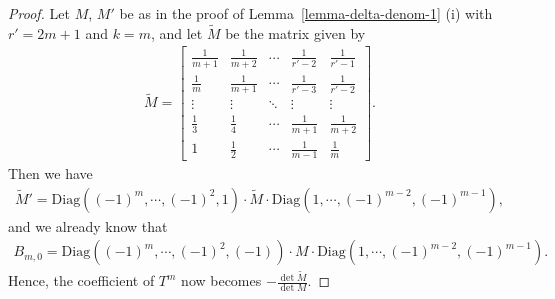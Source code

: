 \documentclass[11pt]{amsart}
\theoremstyle{definition}
\numberwithin{equation}{subsection}
\theoremstyle{plain}
\theoremstyle{plain}
\theoremstyle{plain}
\theoremstyle{plain}
\theoremstyle{plain}
\theoremstyle{plain}
\theoremstyle{plain}
\theoremstyle{plain}
\theoremstyle{plain}
\theoremstyle{plain}
\theoremstyle{plain}
\theoremstyle{plain}
\theoremstyle{definition}
\theoremstyle{definition}
\theoremstyle{definition}
\theoremstyle{remark}
\renewcommand{\(}{\textup{(}}
\renewcommand{\)}{\textup{)}}
\begin{document}
\begin{proof}
Let $M$, $M'$ be as in the proof of Lemma~\ref{lemma-delta-denom-1} (i) with $r'=2m+1$ and $k=m$, and let $\tilde M$ be the matrix given by
    \begin{align*}
        \tilde M
        =
        \begin{bmatrix}
          \frac{1}{m+1} & \frac{1}{m+2} & \cdots & \frac{1}{r'-2} & \frac{1}{r'-1} \\
          \frac{1}{m} & \frac{1}{m+1} & \cdots & \frac{1}{r'-3} & \frac{1}{r'-2} \\
          \vdots & \vdots & \ddots & \vdots & \vdots \\
          \frac{1}{3} & \frac{1}{4} & \cdots & \frac{1}{m+1} & \frac{1}{m+2} \\
          1 & \frac{1}{2} & \cdots & \frac{1}{m-1} & \frac{1}{m}
        \end{bmatrix}.
    \end{align*}
Then we have
    \begin{align*}
        \tilde{M}'=
        \mathrm{Diag}((-1)^m,\cdots,(-1)^2, 1)
        \cdot
        \tilde M
        \cdot
        \mathrm{Diag}(1,\cdots,(-1)^{m-2},(-1)^{m-1}),
    \end{align*}
    and we already know that
    \begin{align*}
        B_{m,0}
        =
        \mathrm{Diag}((-1)^m,\cdots,(-1)^2, (-1))
        \cdot
        M
        \cdot
        \mathrm{Diag}(1,\cdots,(-1)^{m-2},(-1)^{m-1}).
    \end{align*}
Hence, the coefficient of $T^m$ now becomes $-\frac{\det \tilde M}{\det M}$.



\end{proof}
\end{document}
